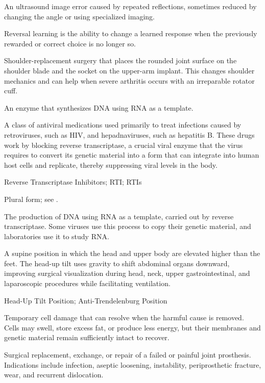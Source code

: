  An ultrasound image error caused by repeated reflections, sometimes reduced by changing the angle or using specialized imaging.

 Reversal learning is the ability to change a learned response when the previously rewarded or correct choice is no longer so.

 Shoulder-replacement surgery that places the rounded joint surface on the shoulder blade and the socket on the upper-arm implant. This changes shoulder mechanics and can help when severe arthritis occurs with an irreparable rotator cuff.

 An enzyme that synthesizes DNA using RNA as a template.

 A class of antiviral medications used primarily to treat infections caused by retroviruses, such as HIV, and hepadnaviruses, such as hepatitis B. These drugs work by blocking reverse transcriptase, a crucial viral enzyme that the virus requires to convert its genetic material into a form that can integrate into human host cells and replicate, thereby suppressing viral levels in the body.

\synonyms
Reverse Transcriptase Inhibitors; RTI; RTIs

 Plural form; see .

 The production of DNA using RNA as a template, carried out by reverse transcriptase. Some viruses use this process to copy their genetic material, and laboratories use it to study RNA.

 A supine position in which the head and upper body are elevated higher than the feet. The head-up tilt uses gravity to shift abdominal organs downward, improving surgical visualization during head, neck, upper gastrointestinal, and laparoscopic procedures while facilitating ventilation.

\synonyms
Head-Up Tilt Position; Anti-Trendelenburg Position

 Temporary cell damage that can resolve when the harmful cause is removed. Cells may swell, store excess fat, or produce less energy, but their membranes and genetic material remain sufficiently intact to recover.

 Surgical replacement, exchange, or repair of a failed or painful joint prosthesis.
Indications include infection, aseptic loosening, instability, periprosthetic fracture,
wear, and recurrent dislocation.

